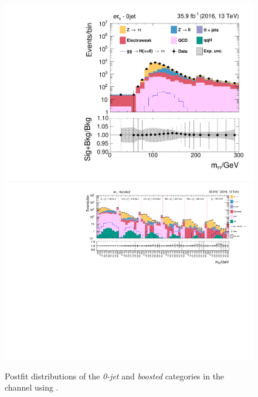 \begin{figure}[h!]
    \centering
        \includegraphics[width=.5\textwidth]{Figures/statana/Postfit_JEC_jdphi/postfit_fit_s_htt_et_1_13TeV.pdf}\\
        \includegraphics[width=\textwidth]{Figures/statana/Postfit_JEC_jdphi/postfit_fit_s_htt_et_2_13TeV.pdf}
    \caption{Postfit distributions of the \textit{0-jet} and \textit{boosted} categories in the \etau{} channel  using \jdphi{}.}
\end{figure} 
